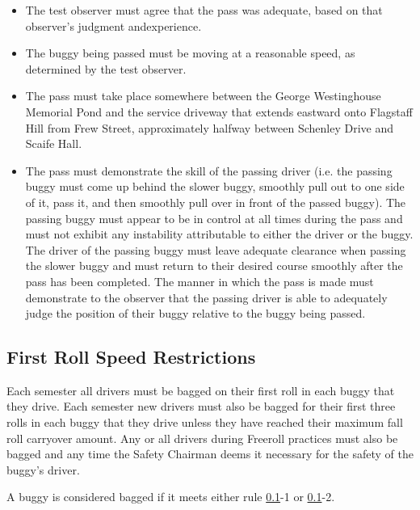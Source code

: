 	\begin{itemize}

		\item The test observer must agree that the pass was adequate, based on that observer's judgment andexperience.

		\item The buggy being passed must be moving at a reasonable speed, as determined by the test observer.

		\item The pass must take place somewhere between the George Westinghouse Memorial Pond and the service driveway that extends eastward onto Flagstaff Hill from Frew Street, approximately halfway between Schenley Drive and Scaife Hall.

		\item The pass must demonstrate the skill of the passing driver (i.e. the passing buggy must come up behind the slower buggy, smoothly pull out to one side of it, pass it, and then smoothly pull over in front of the passed buggy). The passing buggy must appear to be in control at all times during the pass and must not exhibit any instability attributable to either the driver or the buggy. The driver of the passing buggy must leave adequate clearance when passing the slower buggy and must return to their desired course smoothly after the pass has been completed. The manner in which the pass is made must demonstrate to the observer that the passing driver is able to adequately judge the position of their buggy relative to the buggy being passed.

	\end{itemize}

\subsection{First Roll Speed Restrictions}
\label{sec:FirstRollSpeedRestrictions}

	Each semester all drivers must be bagged on their first roll in each buggy that they drive. Each semester new drivers must also be bagged for their first three rolls in each buggy that they drive unless they have reached their maximum fall roll carryover amount. Any or all drivers during Freeroll practices must also be bagged and any time the Safety Chairman deems it necessary for the safety of the buggy's driver.

	A buggy is considered bagged if it meets either rule
	\ref{sec:FirstRollSpeedRestrictions}-1 or \ref{sec:FirstRollSpeedRestrictions}-2.


